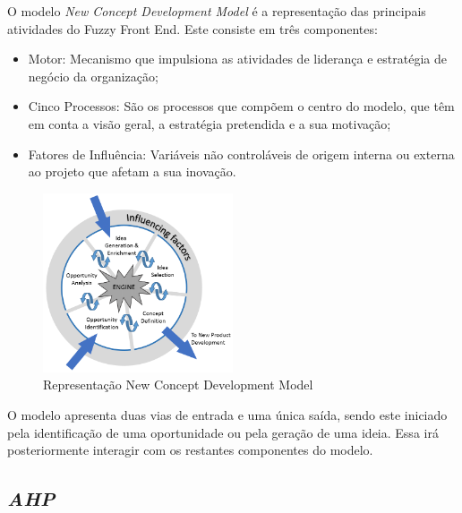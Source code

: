 O modelo \emph{New Concept Development Model} é a representação das principais atividades do Fuzzy Front End. Este consiste em três componentes:

\begin{itemize}

\item Motor: Mecanismo que impulsiona as atividades de liderança e estratégia de negócio da organização;

\item Cinco Processos: São os processos que compõem o centro do modelo, que têm em conta a visão geral, a estratégia pretendida e a sua motivação;

\item Fatores de Influência: Variáveis não controláveis de origem interna ou externa ao projeto que afetam a sua inovação.

\end{itemize}

\begin{figure}[H]
    \begin{center}
    \includegraphics[width=0.5\textwidth]{figures/The-New-Concept-Development-NCD-model-Koen-et-al-2001.png}
    \caption{Representação New Concept Development Model}
    \end{center}
\end{figure}

O modelo apresenta duas vias de entrada e uma única saída, sendo este iniciado pela identificação de uma oportunidade ou pela geração de uma ideia. Essa irá posteriormente interagir com os restantes componentes do modelo.

\subsection{\emph{\acrfull{AHP}}\label{section_AHP}}

